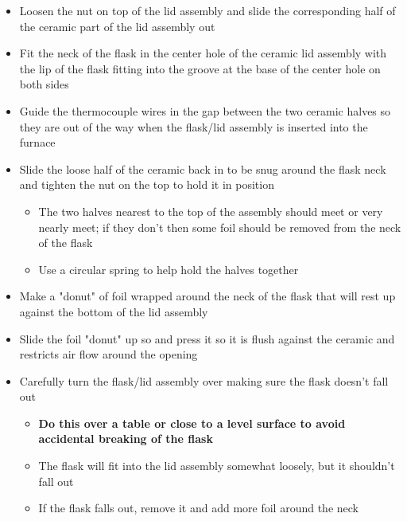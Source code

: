\documentclass[letterpaper,11pt]{article}
\begin{document}
\begin{itemize}
\begin{itemize}
        \item Loosen the nut on top of the lid assembly and slide the 
            corresponding half of the ceramic part of the lid assembly out
        \item Fit the neck of the flask in the center hole of the ceramic lid 
            assembly with the lip of the flask fitting into the groove at the 
            base of the center hole on both sides
        \item Guide the thermocouple wires in the gap between the two ceramic 
            halves so they are out of the way when the flask/lid assembly is 
            inserted into the furnace
        \item Slide the loose half of the ceramic back in to be snug 
            around the flask neck and tighten the nut on the top to hold it
            in position
                \begin{itemize}
                \item The two halves nearest to the top of the assembly should 
                    meet or very nearly meet; if they don't then some 
                    foil should be removed from the neck of the flask
                \item Use a circular spring to help hold the halves together
                \end{itemize}
        
        \item Make a "donut" of foil wrapped around the neck of the flask that 
            will rest up against the bottom of the lid assembly
        \item Slide the foil "donut" up so and press it so it is flush against 
            the ceramic and restricts air flow around the opening
        \item Carefully turn the flask/lid assembly over making sure the flask 
            doesn't fall out
                \begin{itemize}
                \item \textbf{Do this over a table or close to a level surface 
                    to avoid accidental breaking of the flask}
                \item The flask will fit into the lid assembly somewhat loosely, 
                    but it shouldn't fall out
                \item If the flask falls out, remove it and add more foil 
                around the neck
                \end{itemize}
         

\end{itemize}
\end{itemize}
\end{document}
